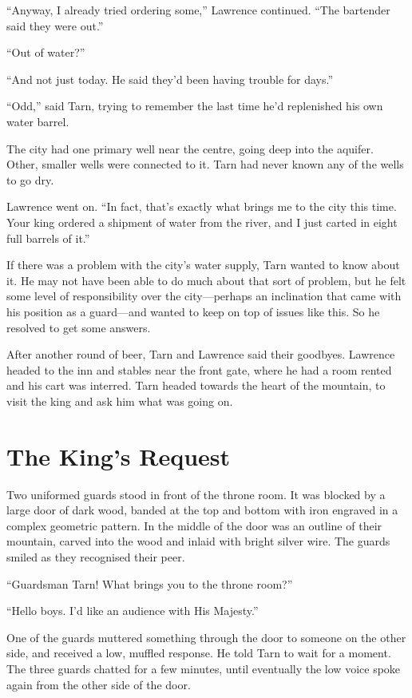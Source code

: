 ``Anyway, I already tried ordering some,'' Lawrence continued.  ``The bartender said they were out.''

``Out of water?''

``And not just today.  He said they'd been having trouble for days.''

``Odd,'' said Tarn, trying to remember the last time he'd replenished his own water barrel.

The city had one primary well near the centre, going deep into the aquifer.  Other, smaller wells were connected to it.  Tarn had never known any of the wells to go dry.

Lawrence went on.  ``In fact, that's exactly what brings me to the city this time.  Your king ordered a shipment of water from the river, and I just carted in eight full barrels of it.''

If there was a problem with the city's water supply, Tarn wanted to know about it.  He may not have been able to do much about that sort of problem, but he felt some level of responsibility over the city---perhaps an inclination that came with his position as a guard---and wanted to keep on top of issues like this.  So he resolved to get some answers.

After another round of beer, Tarn and Lawrence said their goodbyes. Lawrence headed to the inn and stables near the front gate, where he had a room rented and his cart was interred.  Tarn headed towards the heart of the mountain, to visit the king and ask him what was going on.

\chapter{The King's Request}

Two uniformed guards stood in front of the throne room.  It was blocked by a large door of dark wood, banded at the top and bottom with iron engraved in a complex geometric pattern.  In the middle of the door was an outline of their mountain, carved into the wood and inlaid with bright silver wire.  The guards smiled as they recognised their peer.

``Guardsman Tarn!  What brings you to the throne room?''

``Hello boys.  I'd like an audience with His Majesty.''

One of the guards muttered something through the door to someone on the other side, and received a low, muffled response.  He told Tarn to wait for a moment.  The three guards chatted for a few minutes, until eventually the low voice spoke again from the other side of the door.

